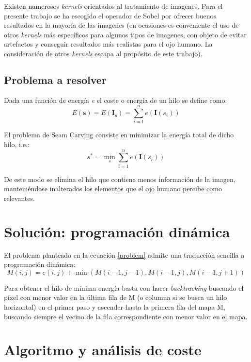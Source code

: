 \documentclass[12pt,a4paper,oneside]{article}
\begin{document}
Existen numerosos \textit{kernels} orientados al tratamiento de imagenes. Para el presente
trabajo se ha escogido el operador de Sobel por ofrecer buenos resultados en la mayoría de
las imagenes (en ocasiones es conveniente el uso de otros \textit{kernels} más específicos
para algunos tipos de imagenes, con objeto de evitar artefactos y conseguir resultados
más realistas para el ojo humano. La consideración de otros \textit{kernels} escapa al 
propósito de este trabajo).

\subsection{Problema a resolver}
Dada una función de energía \textit{e} el coste o energía de un hilo se define como:
\begin{equation}
    E(\textbf{s}) = E(\textbf{I}_\textbf{s}) = \sum_{i=1}^n e(\textbf{I}(s_i))
\end{equation}

El problema de Seam Carving consiste en minimizar la energía total de dicho hilo, i.e.:
\begin{equation}
    s^* = \min_s \sum_{i=1}^n e(\textbf{I}(s_i))
    \label{problem}
\end{equation}

De este modo se elimina el hilo que contiene menos información de la imagen, manteniéndose
inalterados los elementos que el ojo humano percibe como relevantes.

\section{Solución: programación dinámica}
El problema planteado en la ecuación \ref{problem} admite una traducción sencilla a programación 
dinámica:
\begin{equation}
    M(i,j) = e(i,j) + \min (M(i-1, j-1), M(i-1,j), M(i-1, j+1))
\end{equation}

Para obtener el hilo de mínima energía basta con hacer \textit{backtracking} buscando el 
píxel con menor valor en la última fila de M (o columna si se busca un hilo horizontal)
en el primer paso y ascender hasta la primera fila del mapa M, buscando siempre el vecino
de la fila correspondiente con menor valor en el mapa.

\section{Algoritmo y análisis de coste}
\end{document}
